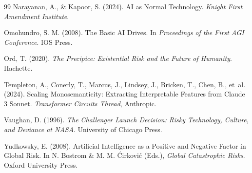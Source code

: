 \documentclass[11pt]{article}
\begin{document}
\begin{thebibliography}{99}
Narayanan, A., \& Kapoor, S. (2024). AI as Normal Technology. \textit{Knight First Amendment Institute}.

Omohundro, S. M. (2008). The Basic AI Drives. In \textit{Proceedings of the First AGI Conference}. IOS Press.

Ord, T. (2020). \textit{The Precipice: Existential Risk and the Future of Humanity}. Hachette.

Templeton, A., Conerly, T., Marcus, J., Lindsey, J., Bricken, T., Chen, B., et~al. (2024). Scaling Monosemanticity: Extracting Interpretable Features from Claude 3 Sonnet. \textit{Transformer Circuits Thread}, Anthropic.

Vaughan, D. (1996). \textit{The Challenger Launch Decision: Risky Technology, Culture, and Deviance at NASA}. University of Chicago Press.

Yudkowsky, E. (2008). Artificial Intelligence as a Positive and Negative Factor in Global Risk. In N. Bostrom \& M. M. \'{C}irkovi\'{c} (Eds.), \textit{Global Catastrophic Risks}. Oxford University Press.

\end{thebibliography}
\end{document}
